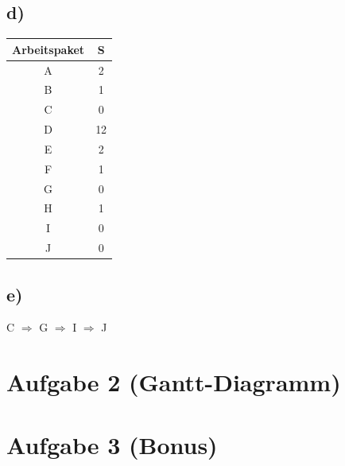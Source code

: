 \documentclass[a4paper]{report}
\begin{document}
\subsection*{d)}

\begin{center}
\begin{tabular}{ |c|c| } 
 \hline
 Arbeitspaket & S \\ \hline
 A & 2 \\ 
 B & 1 \\ 
 C & 0 \\ 
 D & 12 \\ 
 E & 2 \\ 
 F & 1 \\ 
 G & 0 \\ 
 H & 1 \\ 
 I & 0 \\
 J & 0 \\
 \hline
\end{tabular}
\end{center}

\subsection*{e)}

C $\Rightarrow$ G $\Rightarrow$ I $\Rightarrow$ J

\section*{Aufgabe 2 (Gantt-Diagramm)}

\section*{Aufgabe 3 (Bonus)}
\end{document}

